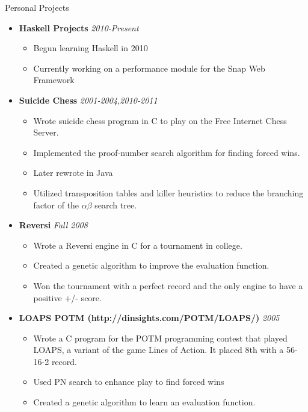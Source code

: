 \documentclass[11pt,oneside]{article}
\newenvironment{ressection}[1]{
	\vspace{4pt}
	{\fontfamily{phv}\selectfont\Large#1}
	\begin{itemize}
	\vspace{3pt}
}{
	\end{itemize}
}
\newcommand{\ressubitem}[1]{
	\vspace{-1pt}
	\item \begin{flushleft} #1 \end{flushleft}
}
\newcommand{\resbigitemb}[2]{
	\vspace{-5pt}
	\item{\textbf{#1} \hfill \textit{#2}}
}
\newenvironment{resdateditem}[2]{
	\resbigitemb{#1}{#2}
	\vspace{-2pt}
	\begin{itemize}
}{
	\end{itemize}
}
\begin{document}
\begin{ressection}{Personal Projects}
  
  \begin{resdateditem}{Haskell Projects}{2010-Present}
    \ressubitem{Begun learning Haskell in 2010}
    \ressubitem{Currently working on a performance module for the Snap Web Framework}
  \end{resdateditem}


  \begin{resdateditem}{Suicide Chess}{2001-2004,2010-2011}
    \ressubitem{Wrote suicide chess program in C to play on the Free Internet Chess Server.}
    \ressubitem{Implemented the proof-number search algorithm for finding forced wins.}
    \ressubitem{Later rewrote in Java}
    \ressubitem{Utilized transposition tables and killer heuristics to reduce the branching factor of the $\alpha\beta$ search tree.}
  \end{resdateditem}

  \begin{resdateditem}{Reversi}{Fall 2008}
    \ressubitem{Wrote a Reversi engine in C for a tournament in college.}
		\ressubitem{Created a genetic algorithm to improve the evaluation function.}
		\ressubitem{Won the tournament with a perfect record and the only engine to have a positive +/- score.}
  \end{resdateditem}
	

  \begin{resdateditem}{LOAPS POTM (http://dinsights.com/POTM/LOAPS/)}{2005}
    \ressubitem{Wrote a C program for the POTM programming contest that
    played LOAPS, a variant of the game Lines of Action.  It placed 8th
    with a 56-16-2 record.}
    \ressubitem{Used PN search to enhance play to find forced wins}
    \ressubitem{Created a genetic algorithm to learn an evaluation function.}
  \end{resdateditem}

\end{ressection}
\end{document}
